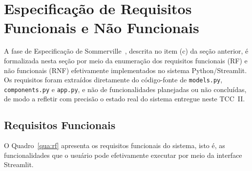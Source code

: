 \section{Especificação de Requisitos Funcionais e Não Funcionais}
\label{sec:requisitos}

A fase de Especificação de Sommerville~\cite{sommerville2011}, descrita no item (c) da
seção anterior, é formalizada nesta seção por meio da enumeração dos requisitos
funcionais (RF) e não funcionais (RNF) efetivamente implementados no sistema
Python/Streamlit. Os requisitos foram extraídos diretamente do código-fonte de
\texttt{models.py}, \texttt{components.py} e \texttt{app.py}, e não de funcionalidades
planejadas ou não concluídas, de modo a refletir com precisão o estado real do sistema
entregue neste TCC~II.

\subsection{Requisitos Funcionais}

O Quadro~\ref{qua:rf} apresenta os requisitos funcionais do sistema, isto é, as
funcionalidades que o usuário pode efetivamente executar por meio da interface
Streamlit.

